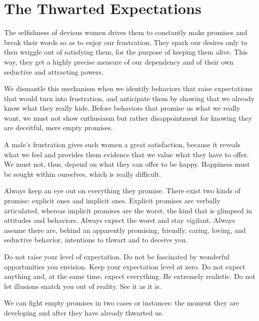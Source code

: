 \section{The Thwarted Expectations}

\par The selfishness of devious women drives them to constantly make promises and break their words so as to enjoy our frustration. They spark our desires only to then wriggle out of satisfying them, for the purpose of keeping them alive. This way, they get a highly precise measure of our dependency and of their own seductive and attracting powers.

\par We dismantle this mechanism when we identify behaviors that raise expectations that would turn into frustration, and anticipate them by showing that we already know what they really hide. Before behaviors that promise us what we really want, we must not show enthusiasm but rather disappointment for knowing they are deceitful, mere empty promises.

\par A male's frustration gives such women a great satisfaction, because it reveals what we feel and provides them evidence that we value what they have to offer. We must not, thus, depend on what they can offer to be happy. Happiness must be sought within ourselves, which is really difficult.

\par Always keep an eye out on everything they promise. There exist two kinds of promise: explicit ones and implicit ones. Explicit promises are verbally articulated, whereas implicit promises are the worst, the kind that is glimpsed in attitudes and behaviors. Always expect the worst and stay vigilant. Always assume there are, behind an apparently promising, friendly, caring, loving, and seductive behavior, intentions to thwart and to deceive you.

\par Do not raise your level of expectation. Do not be fascinated by wonderful opportunities you envision. Keep your expectation level at zero. Do not expect anything and, at the same time, expect everything. Be extremely realistic. Do not let illusions snatch you out of reality. See it as it is.

\par We can fight empty promises in two cases or instances: the moment they are developing and after they have already thwarted us.

